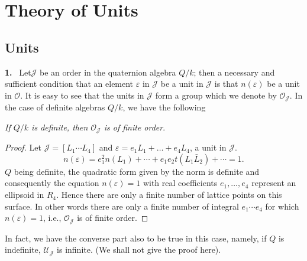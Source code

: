 
\chapter{Theory of Units}\label{chap2} %

\setcounter{section}{3}
\section{Units}\label{chap2:sec4}

\textbf{1.}~ Let\pageoriginale $\mathcal{J}$ be an order in the
quaternion algebra $Q/ k$; 
then a necessary and sufficient condition that an element
$\varepsilon$ in $\mathcal{J}$ be a unit in $\mathcal{J}$ is that
$n(\varepsilon)$ be a unit in $\mathscr{O}$. It is easy to see that
the units in $\mathcal{J}$ form a group which we denote by
$\mathscr{O}_\mathcal{J}$. In the case of definite algebras $Q/k$, we
have the following  
\setcounter{theorem}{0}
\begin{theorem}\label{chap1:sec4:thm1} %
  {\em If $Q/k$ is definite, then $\mathscr{O}_\mathcal{J}$ is of finite order}.
\end{theorem}
 
\begin{proof}
  Let $\mathcal{J}= [L_1 \cdots L_4]$ and $\varepsilon= e_1 L_1 +
  \ldots + e_4 L_4$, a unit in $\mathcal{J}$. 
  $$
  n(\varepsilon) =e^2_1 n(L_1) + \cdots + e_1 e_2 t(L_1 \bar{L}_2)+ \cdots =1.
  $$
  $Q$ being definite, the quadratic form given by the norm is definite
  and consequently  the equation $n(\varepsilon)=1$ with real
  coefficients $e_1, \ldots,  e_4$ represent an ellipsoid in
  $R_4$. Hence there are only  a finite number of lattice points on
  this surface. In other words there are only a finite number of
  integral $e_1 \cdots e_4$ for which  $n(\varepsilon)=1$, i.e.,
  $\mathscr{O}_\mathcal{J}$ is of finite order. 
\end{proof} 

\begin{note}
  In fact, we have the converse part also to be true in this case,
  namely, if $Q$ is indefinite, $\mathscr{U}_\mathcal{J}$ is
  infinite. (We shall not give the proof here). 
\end{note}


